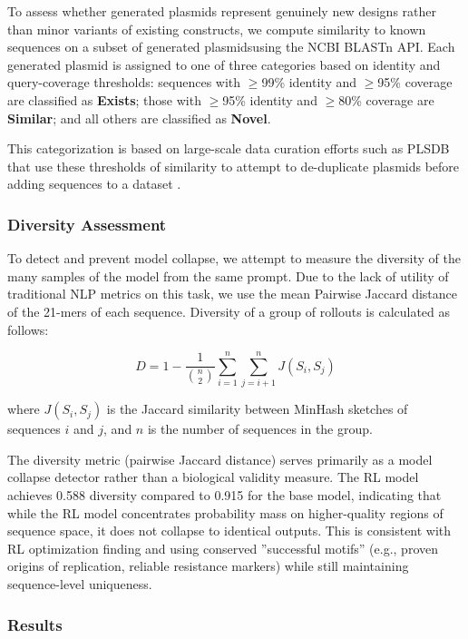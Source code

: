 \documentclass{article}
\theoremstyle{plain}
\theoremstyle{definition}
\theoremstyle{remark}
\begin{document}
To assess whether generated plasmids represent genuinely new designs
rather than minor variants of existing constructs, we compute similarity
to known sequences on a subset of generated plasmidsusing the NCBI BLASTn API. Each generated plasmid is
assigned to one of three categories based on identity and query-coverage
thresholds: sequences with $\geq$99\% identity and $\geq$95\% coverage
are classified as \textbf{Exists}; those with $\geq$95\% identity and
$\geq$80\% coverage are \textbf{Similar}; and all others are classified
as \textbf{Novel}.

This categorization is based on large-scale data curation efforts such
as PLSDB that use these thresholds of similarity to attempt to
de-duplicate plasmids before adding sequences to a dataset
\cite{PLSDB}.

\subsubsection{Diversity Assessment}

To detect and prevent model collapse, we attempt to measure the
diversity of the many samples of the model from the same prompt. Due to
the lack of utility of traditional NLP metrics on this task, we use the
mean Pairwise Jaccard distance of the 21-mers of each sequence.
Diversity of a group of rollouts is calculated as follows:

\[D = 1 - \frac{1}{\binom{n}{2}} \sum_{i=1}^{n} \sum_{j=i+1}^{n} J(S_i, S_j)\]

where $J(S_i, S_j)$ is the Jaccard similarity between MinHash
sketches \cite{minhash} of sequences $i$ and $j$, and $n$ is the number of sequences
in the group.

The diversity metric (pairwise Jaccard distance) serves primarily as a
model collapse detector rather than a biological validity measure. The
RL model achieves 0.588 diversity compared to 0.915 for the base model,
indicating that while the RL model concentrates probability mass on
higher-quality regions of sequence space, it does not collapse to
identical outputs. This is consistent with RL optimization finding and using
conserved ''successful motifs'' (e.g., proven origins of replication,
reliable resistance markers) while still maintaining sequence-level
uniqueness.

\subsubsection{Results}
\end{document}
